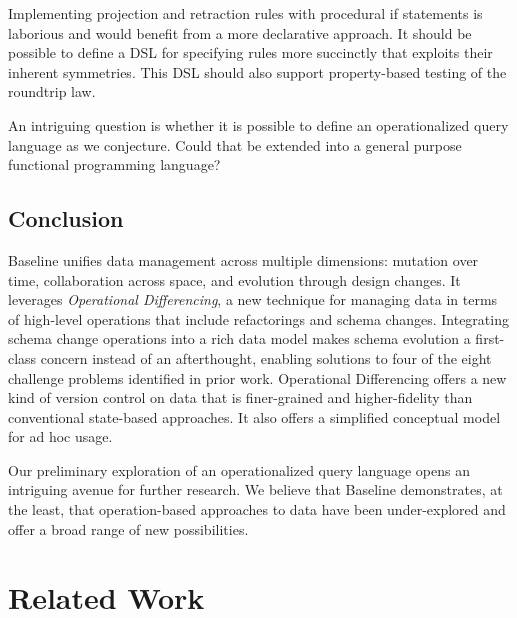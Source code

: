 \documentclass[english,submission]{programming}
\theoremstyle{definition}
\begin{document}
Implementing projection and retraction rules with procedural if statements is laborious and would benefit from a more declarative approach. It should be possible to define a DSL for specifying rules more succinctly that exploits their inherent symmetries.
This DSL should also support property-based testing of the roundtrip law.

An intriguing question is whether it is possible to define an operationalized query language as we conjecture. Could that be extended into a general purpose functional programming language?


\subsection{Conclusion}

Baseline unifies data management across multiple dimensions: mutation over time, collaboration across space, and evolution through design changes. It leverages \textit{Operational Differencing}, a new technique for managing data in terms of high-level operations that include refactorings and schema changes.
Integrating schema change operations into a rich data model makes schema evolution a first-class concern instead of an afterthought, enabling solutions to four of the eight challenge problems identified in prior work.
Operational Differencing offers a new kind of version control on data that is finer-grained and higher-fidelity than conventional state-based approaches. It also offers a simplified conceptual model for ad hoc usage.

Our preliminary exploration of an operationalized query language opens an intriguing avenue for further research.
We believe that Baseline demonstrates, at the least, that operation-based approaches to data have been under-explored and offer a broad range of new possibilities.


\section{Related Work}

\end{document}
